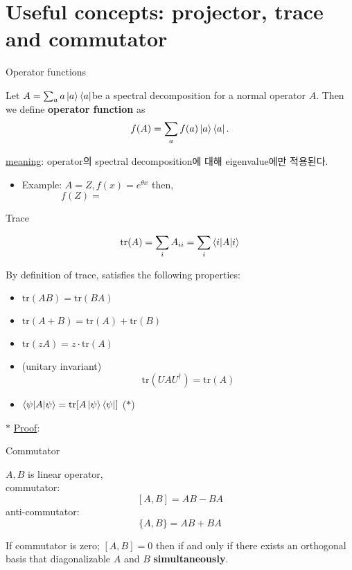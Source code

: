 \documentclass[9pt]{beamer}
\begin{document}
    \section{Useful concepts: projector, trace and commutator}
    \begin{frame}{Operator functions}
        \begin{definition}
            Let $A= \sum_a a\ket{a}\bra a$be a spectral decomposition for a normal operator $A$. Then we define \textbf{operator function} as
            $$f(A) = \sum_a f(a) \ket a \bra a.$$ 
        \end{definition}
        \checkmark \underline{meaning}: operator의 spectral decomposition에 대해 eigenvalue에만 적용된다.
        \begin{itemize}
            \item Example:
            $A = Z, f(x) = e^{\theta x}$ then,
            \vspace{0.8cm}
            $$ f(Z) = \qquad \qquad \qquad \qquad \qquad \qquad \qquad \qquad \qquad \qquad \qquad$$
        \end{itemize}
    \end{frame}

    \begin{frame}{Trace}
        \begin{definition}[trace]
        $$\text{tr}(A) = \sum_i A_{ii}= \sum_i \braket{i|A|i}$$
        \end{definition}
        By definition of trace, satisfies the following properties:
        \begin{itemize}
            \item $\text{tr}(AB) = \text{tr}(BA)$
            \item $\text{tr}(A+B) = \text{tr}(A) + \text{tr}(B)$
            \item $\text{tr}(zA) = z \cdot \text{tr}(A)$
            \item (unitary invariant)
            $$\text{tr}(UAU^\dagger) = \text{tr}(A)$$
            \item $\braket{\psi | A |\psi} = \text{tr}[A \ket \psi \bra \psi]$ ($\ast$)
        \end{itemize}
        \vspace{0.4cm}
        $\ast$ \underline{Proof}:
    \end{frame}

    \begin{frame}{Commutator}
        \begin{definition}[commutator]
            $A, B$ is linear operator,\\
            commutator:
            $$[A, B] = AB-BA$$
            anti-commutator:
            $$\{A, B\} = AB + BA$$
        \end{definition}
        \begin{theorem}
            If commutator is zero; $[A, B]=0$ then if and only if there exists an orthogonal basis that diagonalizable $A$ and $B$ \textbf{simultaneously}.
        \end{theorem}
    \end{frame}
\end{document}
